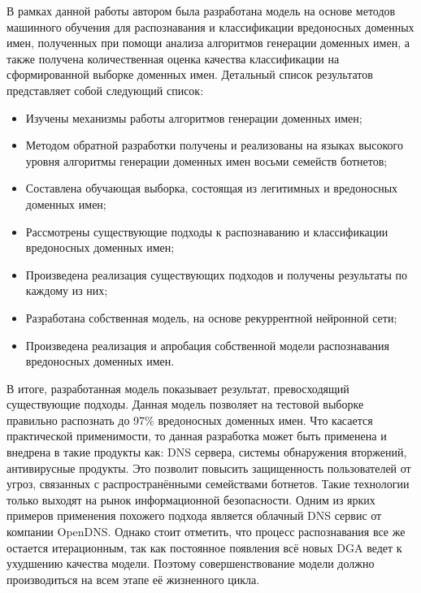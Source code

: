 В рамках данной работы автором была разработана модель на основе методов машинного обучения для распознавания и классификации вредоносных доменных имен, полученных при помощи анализа алгоритмов генерации доменных имен, а также получена количественная оценка качества классификации на сформированной выборке доменных имен. Детальный список результатов представляет собой следующий список:
\begin{itemize}
\item Изучены механизмы работы алгоритмов генерации доменных имен;
\item Методом обратной разработки получены и реализованы на языках высокого уровня алгоритмы генерации доменных имен восьми семейств ботнетов;
\item Составлена обучающая выборка, состоящая из легитимных и вредоносных доменных имен;
\item Рассмотрены существующие подходы к распознаванию и классификации вредоносных доменных имен;
\item Произведена реализация существующих подходов и получены результаты по каждому из них;
\item Разработана собственная модель, на основе рекуррентной нейронной сети;
\item Произведена реализация и апробация собственной модели распознавания вредоносных доменных имен.
\end{itemize}

В итоге, разработанная модель показывает результат, превосходящий существующие подходы. Данная модель позволяет на тестовой выборке правильно распознать до 97\% вредоносных доменных имен.
Что касается практической применимости, то данная разработка может быть применена и внедрена в такие продукты как: DNS сервера, системы обнаружения вторжений, антивирусные продукты. Это позволит повысить защищенность пользователей от угроз, связанных с распространёнными семействами ботнетов. Такие технологии только выходят на рынок информационной безопасности. Одним из ярких примеров применения похожего подхода является облачный DNS сервис от компании OpenDNS. Однако стоит отметить, что процесс распознавания все же остается итерационным, так как постоянное появления всё новых DGA ведет к ухудшению качества модели. Поэтому совершенствование модели должно производиться на всем этапе её жизненного цикла.
\clearpage